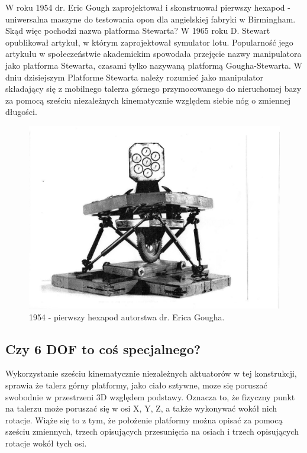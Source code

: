 W roku 1954 dr. Eric Gough zaprojektował i skonstruował pierwszy hexapod - uniwersalna maszyne do testowania opon dla angielskiej fabryki w Birmingham.
Skąd więc pochodzi nazwa platforma Stewarta? W 1965 roku D. Stewart opublikował artykuł, w którym zaprojektował symulator lotu. Popularność jego artykułu w społeczeństwie akademickim spowodała przejęcie nazwy manipulatora jako platforma Stewarta, czasami tylko nazywaną platformą Gougha-Stewarta. 
W dniu dzisiejszym Platforme Stewarta należy rozumieć jako manipulator składający się z mobilnego talerza górnego przymocowanego do nieruchomej bazy za pomocą sześciu  niezależnych kinematycznie względem siebie nóg o zmiennej długości.

\begin{figure}[!h]
    \label{fig:anzelm}
    \centering
    \includegraphics[width=0.5\linewidth]{img/GoughPlatform.jpg}
    \caption{1954 - pierwszy hexapod autorstwa dr. Erica Gougha.}
\end{figure}





\subsection{Czy 6 DOF to coś specjalnego?}

Wykorzystanie sześciu kinematycznie niezależnych aktuatorów w tej konstrukcji, sprawia że talerz górny platformy, jako ciało sztywne, moze się poruszać swobodnie w przestrzeni 3D względem podstawy.
Oznacza to, że fizyczny punkt na talerzu może poruszać się w osi X, Y, Z, a także wykonywać wokół nich rotacje.
Wiąże się to z tym, że położenie platformy można opisać za pomocą sześciu zmiennych, trzech opisujących przesunięcia na osiach i trzech opisujących rotacje wokół tych osi.

